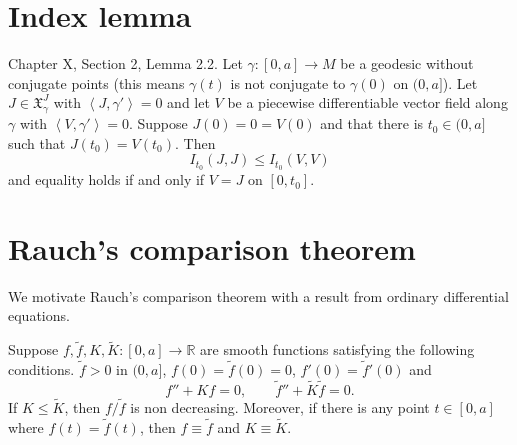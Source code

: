 \section{Index lemma}
\label{section-index-lemma}

\begin{lemma}[Index]
\label{lemma-index}
\cite{doc} Chapter X, Section 2, Lemma 2.2. Let $\gamma:[0,a]\to M$ be a
geodesic without conjugate points (this means $\gamma(t)$ is not conjugate to
$\gamma(0)$ on $(0,a]$). Let $J\in\mathfrak{X}_\gamma^J$ with
$\left<J,\gamma'\right>=0$ and let $V$ be a piecewise differentiable vector
field along $\gamma$ with $\left<V,\gamma'\right>=0$. Suppose $J(0)=0=V(0)$ and
that there is  $t_0\in(0,a]$ such that $J(t_0)=V(t_0)$. Then
$$
I_{t_0}(J,J)\leq I_{t_0}(V,V)
$$
and equality holds if and only if $V=J$ on $[0,t_0]$.
\end{lemma}

\section{Rauch's comparison theorem}
\label{section-Rauch}

We motivate Rauch's comparison theorem with a result from ordinary
differential equations.

\begin{theorem}[Sturm]
\label{theorem-Sturm}
Suppose $f,\tilde{f},K,\tilde{K}:[0,a]\to \mathbb{R}$ are smooth functions
satisfying the following conditions. $\tilde{f} > 0$ in $(0,a]$, $f(0)=\tilde{f}(0)=0$,
$f'(0)=\tilde{f}'(0)$ and
$$
f''+Kf=0,\qquad \tilde{f}''+\tilde{K}\tilde{f}=0.
$$
If $K\leq \tilde{K}$, then $f/\tilde{f}$ is non decreasing. Moreover, if there
is any point $t \in [0,a]$ where $f(t)=\tilde{f}(t)$, then $f \equiv \tilde{f}$
and $K \equiv \tilde{K}$.
\end{theorem}

